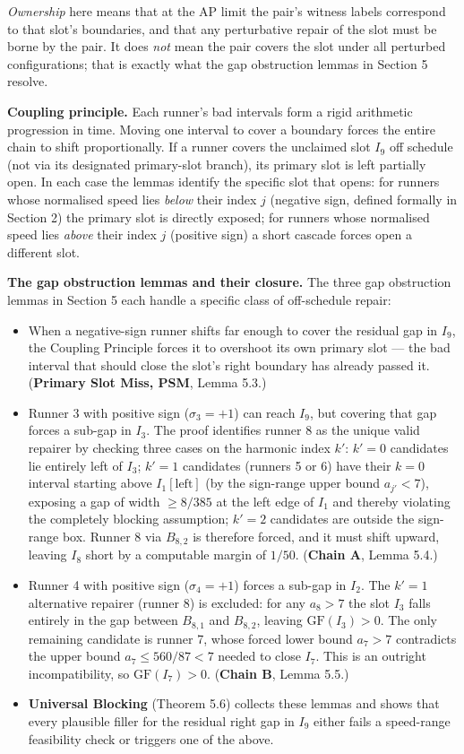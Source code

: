\documentclass[12pt]{article}
\begin{document}
\emph{Ownership} here means that at the AP limit the pair's witness labels correspond to
that slot's boundaries, and that any perturbative repair of the slot must be borne by the
pair. It does \emph{not} mean the pair covers the slot under all perturbed configurations;
that is exactly what the gap obstruction lemmas in Section 5 resolve.

\textbf{Coupling principle.}
Each runner's bad intervals form a rigid arithmetic progression in time. Moving one
interval to cover a boundary forces the entire chain to shift proportionally. If a runner
covers the unclaimed slot $I_9$ off schedule (not via its designated primary-slot branch),
its primary slot is left partially open. In each case the lemmas identify the specific slot
that opens: for runners whose normalised speed lies \emph{below} their index $j$ (negative sign,
defined formally in Section 2) the primary slot is directly exposed; for runners whose
normalised speed lies \emph{above} their index $j$ (positive sign) a short cascade forces open
a different slot.

\textbf{The gap obstruction lemmas and their closure.}
The three gap obstruction lemmas in Section 5 each handle a specific class of off-schedule
repair:

\begin{itemize}
\item When a negative-sign runner shifts far enough to cover the residual gap in $I_9$, the
  Coupling Principle forces it to overshoot its own primary slot --- the bad interval that
  should close the slot's right boundary has already passed it. (\textbf{Primary Slot Miss, PSM},
  Lemma 5.3.)
\item Runner 3 with positive sign ($\sigma_3=+1$) can reach $I_9$, but covering that gap
  forces a sub-gap in $I_3$. The proof identifies runner 8 as the unique valid repairer by
  checking three cases on the harmonic index $k'$: $k'=0$ candidates lie entirely left of
  $I_3$; $k'=1$ candidates (runners 5 or 6) have their $k=0$ interval starting above
  $I_1[\text{left}]$ (by the sign-range upper bound $a_{j'}<7$), exposing a gap of width
  $\ge 8/385$ at the left edge of $I_1$ and thereby violating the completely blocking
  assumption; $k'=2$ candidates are outside the sign-range box. Runner 8 via $B_{8,2}$ is
  therefore forced, and it must shift upward, leaving $I_8$ short by a computable margin
  of $1/50$. (\textbf{Chain A}, Lemma 5.4.)
\item Runner 4 with positive sign ($\sigma_4=+1$) forces a sub-gap in $I_2$. The $k'=1$
  alternative repairer (runner 8) is excluded: for any $a_8>7$ the slot $I_3$ falls
  entirely in the gap between $B_{8,1}$ and $B_{8,2}$, leaving $\mathrm{GF}(I_3)>0$.
  The only remaining candidate is runner 7, whose forced lower bound $a_7>7$ contradicts
  the upper bound $a_7\le 560/87<7$ needed to close $I_7$. This is an outright
  incompatibility, so $\mathrm{GF}(I_7)>0$. (\textbf{Chain B}, Lemma 5.5.)
\item \textbf{Universal Blocking} (Theorem 5.6) collects these lemmas and shows that every
  plausible filler for the residual right gap in $I_9$ either fails a speed-range
  feasibility check or triggers one of the above.
\end{itemize}
\end{document}

